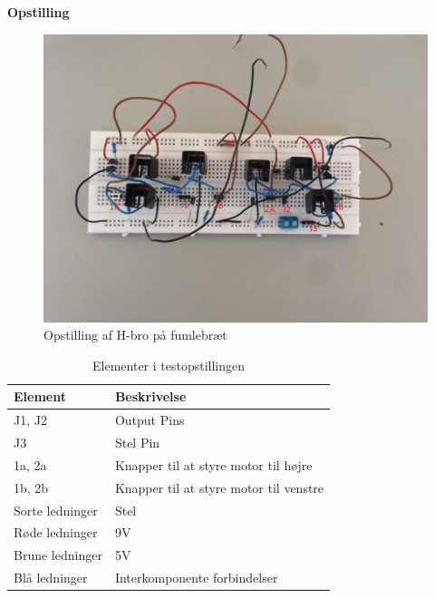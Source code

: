 \noindent \textbf{Opstilling}

\begin{figure}[H]
	\centering
	\includegraphics[width=\textwidth]{test/images/testhbroopst}
	\caption{Opstilling af H-bro på fumlebræt}
\end{figure}

\begin{table}[H]
	\centering
	\label{hbro}
	\begin{tabular}{|l|l|}
		\hline
		\textbf{Element} & \textbf{Beskrivelse}                   \\ \hline
		J1, J2           & Output Pins                            \\ \hline
		J3               & Stel Pin                               \\ \hline
		1a, 2a           & Knapper til at styre motor til højre   \\ \hline
		1b, 2b           & Knapper til at styre motor til venstre \\ \hline
		Sorte ledninger  & Stel                                   \\ \hline
		Røde ledninger   & 9V                                     \\ \hline
		Brune ledninger  & 5V                                     \\ \hline
		Blå ledninger    & Interkomponente forbindelser           \\ \hline
	\end{tabular}
	\caption{Elementer i testopstillingen}
\end{table}

